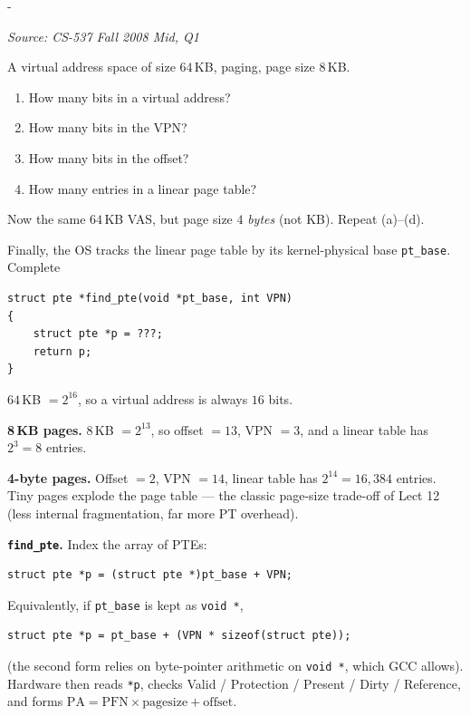 \documentclass[11pt,a4paper]{article}
\makeatletter
\newcommand{\keepspace}[1]{\par\penalty-100\begingroup
  \setlength{\dimen@}{#1}\dimen@ii\pagegoal\advance\dimen@ii-\pagetotal
  \ifdim\dimen@>\dimen@ii\ifdim\dimen@ii>\z@\vfil\fi\break\fi\endgroup}
\newcounter{qn}[section]
\newenvironment{Qn}[4]{%
  \refstepcounter{qn}\keepspace{7\baselineskip}%
  \begin{tcolorbox}[qboxstyle, title={Q\thesection.\theqn\ \ [#1 \textbar\ #2]\ \ #4}]%
  {\footnotesize\color{g3}\textit{Source: #3}}\par\smallskip%
}{%
  \end{tcolorbox}%
}
\newenvironment{Sol}{%
  \begin{tcolorbox}[sboxstyle, title={Solution}]%
}{%
  \end{tcolorbox}\vspace{0.35em}%
}
\makeatother
\begin{document}
\begin{Qn}{Medium-Hard}{Lect 12}{CS-537 Fall 2008 Mid, Q1}{VPN/offset splits for two page sizes, then \texttt{find\_pte}}
A virtual address space of size $64$\,KB, paging, page size $8$\,KB.
\begin{enumerate}
  \item[(a)] How many bits in a virtual address?
  \item[(b)] How many bits in the VPN?
  \item[(c)] How many bits in the offset?
  \item[(d)] How many entries in a linear page table?
\end{enumerate}
Now the same $64$\,KB VAS, but page size $4$ \emph{bytes} (not KB).
Repeat (a)--(d).

Finally, the OS tracks the linear page table by its kernel-physical
base \texttt{pt\_base}. Complete
\begin{lstlisting}[numbers=none]
struct pte *find_pte(void *pt_base, int VPN)
{
    struct pte *p = ???;
    return p;
}
\end{lstlisting}
\end{Qn}
\begin{Sol}
$64$\,KB $=2^{16}$, so a virtual address is always $16$ bits.

\textbf{8\,KB pages.} $8$\,KB $=2^{13}$, so offset $=13$, VPN $=3$,
and a linear table has $2^3=8$ entries.

\textbf{4-byte pages.} Offset $=2$, VPN $=14$, linear table has
$2^{14}=16{,}384$ entries. Tiny pages explode the page table --- the
classic page-size trade-off of Lect 12 (less internal fragmentation,
far more PT overhead).

\textbf{\texttt{find\_pte}.} Index the array of PTEs:
\begin{lstlisting}[numbers=none]
struct pte *p = (struct pte *)pt_base + VPN;
\end{lstlisting}
Equivalently, if \texttt{pt\_base} is kept as \texttt{void *},
\begin{lstlisting}[numbers=none]
struct pte *p = pt_base + (VPN * sizeof(struct pte));
\end{lstlisting}
(the second form relies on byte-pointer arithmetic on
\texttt{void *}, which GCC allows). Hardware then reads
\texttt{*p}, checks Valid / Protection / Present / Dirty / Reference,
and forms $\mathrm{PA}=\mathrm{PFN}\times\mathrm{pagesize}+\mathrm{offset}$.
\end{Sol}
\end{document}
